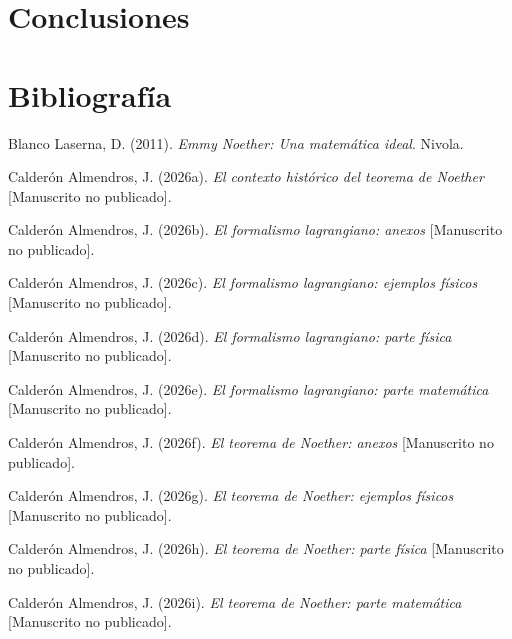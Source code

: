 \documentclass[11pt,a4paper,spanish]{book}
\newlength{\cslhangindent}
\newenvironment{CSLReferences}[2]
 {\begin{list}{}{%
  \setlength{\itemindent}{0pt}
  \setlength{\leftmargin}{0pt}
  \setlength{\parsep}{0pt}
  \ifodd #1
   \setlength{\leftmargin}{\cslhangindent}
   \setlength{\itemindent}{-1\cslhangindent}
  \fi
  \setlength{\itemsep}{#2\baselineskip}}%
  \raggedright
  \renewcommand{\bibitem}[2][]{\item}}
 {\end{list}}
\begin{document}
\chapter{Conclusiones}\label{conclusiones}

\chapter*{Bibliografía}\label{bibliografuxeda}

\protect{}\label{refs}
\begin{CSLReferences}{1}{0}
\bibitem[\citeproctext]{ref-blanco2011}
Blanco Laserna, D. (2011). \emph{Emmy Noether: Una matemática ideal}.
Nivola.

\bibitem[\citeproctext]{ref-calderon2026contexto}
Calderón Almendros, J. (2026a). \emph{El contexto histórico del teorema
de {Noether}} {[}Manuscrito no publicado{]}.

\bibitem[\citeproctext]{ref-calderon2026anexos}
Calderón Almendros, J. (2026b). \emph{El formalismo lagrangiano: anexos}
{[}Manuscrito no publicado{]}.

\bibitem[\citeproctext]{ref-calderon2026fisicaejemplos}
Calderón Almendros, J. (2026c). \emph{El formalismo lagrangiano:
ejemplos físicos} {[}Manuscrito no publicado{]}.

\bibitem[\citeproctext]{ref-calderon2026fisica}
Calderón Almendros, J. (2026d). \emph{El formalismo lagrangiano: parte
física} {[}Manuscrito no publicado{]}.

\bibitem[\citeproctext]{ref-calderon2026matematicas}
Calderón Almendros, J. (2026e). \emph{El formalismo lagrangiano: parte
matemática} {[}Manuscrito no publicado{]}.

\bibitem[\citeproctext]{ref-calderon2026noetheranexos}
Calderón Almendros, J. (2026f). \emph{El teorema de {Noether}: anexos}
{[}Manuscrito no publicado{]}.

\bibitem[\citeproctext]{ref-calderon2026noetherfisej}
Calderón Almendros, J. (2026g). \emph{El teorema de {Noether}: ejemplos
físicos} {[}Manuscrito no publicado{]}.

\bibitem[\citeproctext]{ref-calderon2026noetherfis}
Calderón Almendros, J. (2026h). \emph{El teorema de {Noether}: parte
física} {[}Manuscrito no publicado{]}.

\bibitem[\citeproctext]{ref-calderon2026noethermat}
Calderón Almendros, J. (2026i). \emph{El teorema de {Noether}: parte
matemática} {[}Manuscrito no publicado{]}.


\end{CSLReferences}
\end{document}
